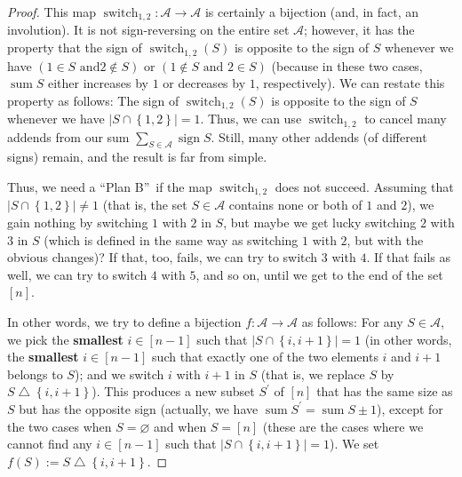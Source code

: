 \begin{proof}
This map $\operatorname*{switch}\nolimits_{1,2}:\mathcal{A}\rightarrow
\mathcal{A}$ is certainly a bijection (and, in fact, an involution). It is not
sign-reversing on the entire set $\mathcal{A}$; however, it has the property
that the sign of $\operatorname*{switch}\nolimits_{1,2}\left(  S\right)  $ is
opposite to the sign of $S$ whenever we have $\left(  1\in S\text{ and
}2\notin S\right)  $ or $\left(  1\notin S\text{ and }2\in S\right)  $
(because in these two cases, $\operatorname*{sum}S$ either increases by $1$ or
decreases by $1$, respectively). We can restate this property as follows: The
sign of $\operatorname*{switch}\nolimits_{1,2}\left(  S\right)  $ is opposite
to the sign of $S$ whenever we have $\left\vert S\cap\left\{  1,2\right\}
\right\vert =1$. Thus, we can use $\operatorname*{switch}\nolimits_{1,2}$ to
cancel many addends from our sum $\sum_{S\in\mathcal{A}}\operatorname*{sign}%
S$. Still, many other addends (of different signs) remain, and the result is
far from simple.

Thus, we need a \textquotedblleft Plan B\textquotedblright\ if the map
$\operatorname*{switch}\nolimits_{1,2}$ does not succeed. Assuming that
$\left\vert S\cap\left\{  1,2\right\}  \right\vert \neq1$ (that is, the set
$S\in\mathcal{A}$ contains none or both of $1$ and $2$), we gain nothing by
switching $1$ with $2$ in $S$, but maybe we get lucky switching $2$ with $3$
in $S$ (which is defined in the same way as switching $1$ with $2$, but with
the obvious changes)? If that, too, fails, we can try to switch $3$ with $4$.
If that fails as well, we can try to switch $4$ with $5$, and so on, until we
get to the end of the set $\left[  n\right]  $.

In other words, we try to define a bijection $f:\mathcal{A}\rightarrow
\mathcal{A}$ as follows: For any $S\in\mathcal{A}$, we pick the
\textbf{smallest} $i\in\left[  n-1\right]  $ such that $\left\vert
S\cap\left\{  i,i+1\right\}  \right\vert =1$ (in other words, the
\textbf{smallest} $i\in\left[  n-1\right]  $ such that exactly one of the two
elements $i$ and $i+1$ belongs to $S$); and we switch $i$ with $i+1$ in $S$
(that is, we replace $S$ by $S\bigtriangleup\left\{  i,i+1\right\}  $). This
produces a new subset $S^{\prime}$ of $\left[  n\right]  $ that has the same
size as $S$ but has the opposite sign (actually, we have $\operatorname*{sum}%
S^{\prime}=\operatorname*{sum}S\pm1$), except for the two cases when
$S=\varnothing$ and when $S=\left[  n\right]  $ (these are the cases where we
cannot find any $i\in\left[  n-1\right]  $ such that $\left\vert S\cap\left\{
i,i+1\right\}  \right\vert =1$). We set $f\left(  S\right)  :=S\bigtriangleup
\left\{  i,i+1\right\}  $.


\end{proof}
